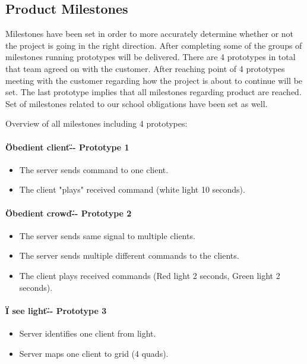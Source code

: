 \subsection{Product Milestones}

Milestones have been set in order to more accurately determine whether or not the project is going in the right direction.
After completing some of the groups of milestones running prototypes will be delivered. 
There are 4 prototypes in total that team agreed on with the customer. 
After reaching point of 4 prototypes meeting with the customer regarding how the project is about to continue will be set. 
The last prototype implies that all milestones regarding product are reached. 
Set of milestones related to our school obligations have been set as well.

 
Overview of all milestones including 4 prototypes:

\paragraph{\"Obedient client\"  -- Prototype 1}
\begin{itemize}
	\item The server sends command to one client.
	\item The client "plays" received command (white light 10 seconds).
\end{itemize}

\paragraph{\"Obedient crowd\" -- Prototype 2}
\begin{itemize}
	\item The server sends same signal to multiple clients.
	\item The server sends multiple different commands to the clients.
	\item The client plays received commands (Red light 2 seconds, Green light 2 seconds).
\end{itemize}

\paragraph{\"I see light\" -- Prototype 3}
\begin{itemize}
	\item Server identifies one client from light.
	\item Server maps one client to grid (4 quads).
\end{itemize}

